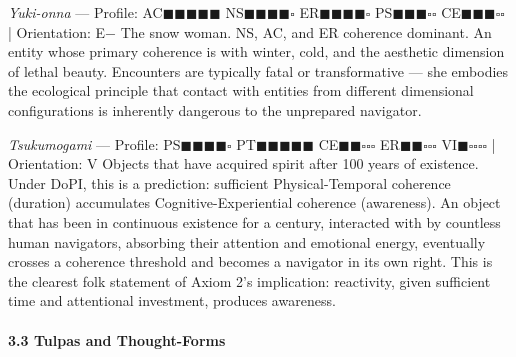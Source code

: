 \textit{Yuki-onna} — Profile: AC$\blacksquare$$\blacksquare$$\blacksquare$$\blacksquare$$\blacksquare$ NS$\blacksquare$$\blacksquare$$\blacksquare$$\blacksquare$$\square$ ER$\blacksquare$$\blacksquare$$\blacksquare$$\blacksquare$$\square$ PS$\blacksquare$$\blacksquare$$\blacksquare$$\square$$\square$ CE$\blacksquare$$\blacksquare$$\blacksquare$$\square$$\square$ | Orientation: E− The snow woman. NS, AC, and ER coherence dominant. An entity whose primary coherence is with winter, cold, and the aesthetic dimension of lethal beauty. Encounters are typically fatal or transformative — she embodies the ecological principle that contact with entities from different dimensional configurations is inherently dangerous to the unprepared navigator.


\textit{Tsukumogami} — Profile: PS$\blacksquare$$\blacksquare$$\blacksquare$$\blacksquare$$\square$ PT$\blacksquare$$\blacksquare$$\blacksquare$$\blacksquare$$\blacksquare$ CE$\blacksquare$$\blacksquare$$\square$$\square$$\square$ ER$\blacksquare$$\blacksquare$$\square$$\square$$\square$ VI$\blacksquare$$\square$$\square$$\square$$\square$ | Orientation: V Objects that have acquired spirit after 100 years of existence. Under DoPI, this is a prediction: sufficient Physical-Temporal coherence (duration) accumulates Cognitive-Experiential coherence (awareness). An object that has been in continuous existence for a century, interacted with by countless human navigators, absorbing their attention and emotional energy, eventually crosses a coherence threshold and becomes a navigator in its own right. This is the clearest folk statement of Axiom 2's implication: reactivity, given sufficient time and attentional investment, produces awareness.


\paragraph*{3.3 Tulpas and Thought-Forms}


